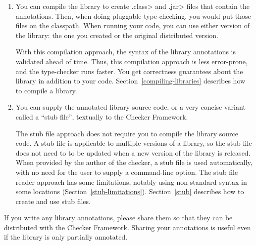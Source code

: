 \begin{enumerate}
\item
  You can compile the library to create \<.class> and \<.jar> files that
  contain the annotations.  Then, when doing pluggable type-checking, you
  would put those files on the classpath.
  When running your code, you can use either version of the library:  the
  one you created or the original distributed version.


  With this compilation approach, the syntax of the library annotations is
  validated ahead of time.  Thus, this compilation approach is less
  error-prone, and the type-checker runs faster.  You get
  correctness guarantees about the library in addition to your code.
  Section~\ref{compiling-libraries} describes how to compile a library.

\item
  You can supply the annotated library source code, or a very concise
  variant called a ``stub file'', textually to the Checker Framework.

  The stub file approach does not require you to compile the library source
  code.
  A stub file is applicable to multiple versions of a library, so
  the stub file does not need to to be updated when a new version of the
  library is released.
  When provided by the author of the checker, a stub file is used
  automatically, with no need for the user to supply a command-line option.
  The stub file reader approach has some limitations, notably using
  non-standard syntax in some locations (Section~\ref{stub-limitations}).
  Section~\ref{stub} describes how to create and use stub files.

\end{enumerate}



If you write any library annotations,
please share them so that they
can be distributed with the Checker Framework.
Sharing your annotations is useful even if the library is only partially
annotated.


